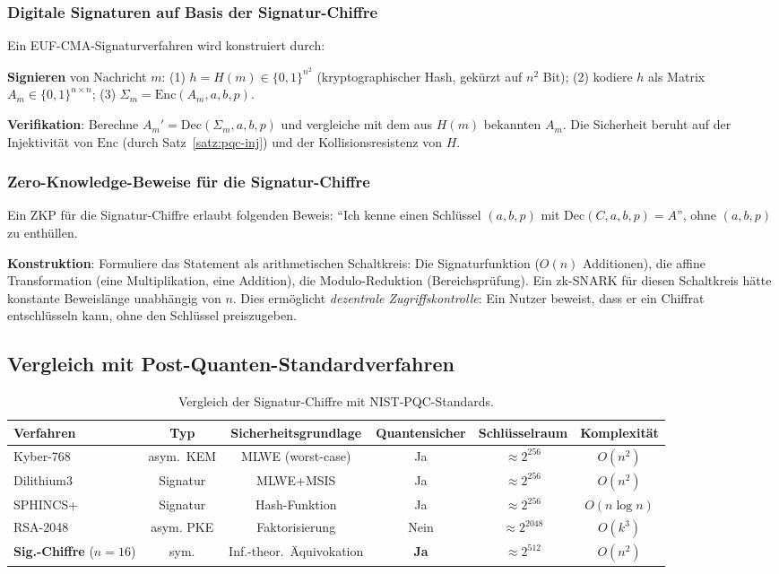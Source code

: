 ﻿\documentclass[a4paper,12pt]{article}
\theoremstyle{definition}
\begin{document}
\subsubsection{Digitale Signaturen auf Basis der Signatur-Chiffre}

Ein EUF-CMA-Signaturverfahren \cite{Epp26b} wird konstruiert durch:

\textbf{Signieren} von Nachricht $m$: (1) $h = H(m) \in \{0,1\}^{n^2}$
(kryptographischer Hash, gekürzt auf $n^2$ Bit); (2) kodiere $h$ als Matrix
$A_m \in \{0,1\}^{n \times n}$; (3) $\Sigma_m = \mathrm{Enc}(A_m, a, b, p)$.

\textbf{Verifikation}: Berechne $A_m' = \mathrm{Dec}(\Sigma_m, a, b, p)$
und vergleiche mit dem aus $H(m)$ bekannten $A_m$.
Die Sicherheit beruht auf der Injektivität von $\mathrm{Enc}$
(durch Satz~\ref{satz:pqc-inj}) und der Kollisionsresistenz von $H$.

\subsubsection{Zero-Knowledge-Beweise für die Signatur-Chiffre}

Ein ZKP für die Signatur-Chiffre erlaubt folgenden Beweis: ``Ich kenne einen
Schlüssel $(a,b,p)$ mit $\mathrm{Dec}(C, a,b,p) = A$'', ohne $(a,b,p)$ zu enthüllen.

\textbf{Konstruktion}: Formuliere das Statement als arithmetischen Schaltkreis:
Die Signaturfunktion ($O(n)$ Additionen), die affine Transformation
(eine Multiplikation, eine Addition), die Modulo-Reduktion (Bereichsprüfung).
Ein zk-SNARK \cite{GGPR13} für diesen Schaltkreis hätte konstante Beweislänge
unabhängig von $n$. Dies ermöglicht \emph{dezentrale Zugriffskontrolle}: Ein
Nutzer beweist, dass er ein Chiffrat entschlüsseln kann, ohne den Schlüssel
preiszugeben.

\subsection{Vergleich mit Post-Quanten-Standardverfahren}

\begin{table}
\centering
\caption{Vergleich der Signatur-Chiffre mit NIST-PQC-Standards.}
\label{tab:sigchiffre-comp}
\begin{tabular}{lccccc}
\toprule
Verfahren & Typ & Sicherheitsgrundlage & Quantensicher & Schlüsselraum & Komplexität \\
\midrule
Kyber-768     & asym.~KEM & MLWE (worst-case) & Ja & $\approx 2^{256}$ & $O(n^2)$ \\
Dilithium3    & Signatur  & MLWE+MSIS & Ja & $\approx 2^{256}$ & $O(n^2)$ \\
SPHINCS+      & Signatur  & Hash-Funktion & Ja & $\approx 2^{256}$ & $O(n \log n)$ \\
RSA-2048      & asym. PKE & Faktorisierung & Nein & $\approx 2^{2048}$ & $O(k^3)$ \\
\textbf{Sig.-Chiffre} ($n{=}16$) & sym. & Inf.-theor.~Äquivokation & \textbf{Ja} & $\approx 2^{512}$ & $O(n^2)$ \\
\bottomrule
\end{tabular}
\end{table}
\end{document}

